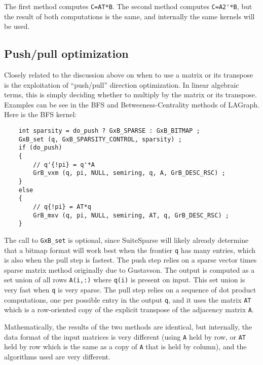 \documentclass[12pt]{article}
\begin{document}
The first method computes \verb'C=AT*B'.  The second method computes
\verb"C=A2'*B", but the result of both computations is the same, and internally
the same kernels will be used.

\subsection{Push/pull optimization}

Closely related to the discussion above on when to use a matrix or its
transpose is the exploitation of ``push/pull'' direction optimization.  In
linear algebraic terms, this is simply deciding whether to multiply by the
matrix or its transpose.  Examples can be see in the BFS and
Betweeness-Centrality methods of LAGraph.  Here is the BFS kernel:

    {\footnotesize
    \begin{verbatim}
    int sparsity = do_push ? GxB_SPARSE : GxB_BITMAP ;
    GxB_set (q, GxB_SPARSITY_CONTROL, sparsity) ;
    if (do_push)
    {
        // q'{!pi} = q'*A
        GrB_vxm (q, pi, NULL, semiring, q, A, GrB_DESC_RSC) ;
    }
    else
    {
        // q{!pi} = AT*q
        GrB_mxv (q, pi, NULL, semiring, AT, q, GrB_DESC_RSC) ;
    }\end{verbatim}}

The call to \verb'GxB_set' is optional, since SuiteSparse will likely already
determine that a bitmap format will work best when the frontier \verb'q' has
many entries, which is also when the pull step is fastest.  The push step
relies on a sparse vector times sparse matrix method originally due to
Gustavson.  The output is computed as a set union of all rows \verb'A(i,:)'
where \verb'q(i)' is present on input.  This set union is very fast when
\verb'q' is very sparse.  The pull step relies on a sequence of dot product
computations, one per possible entry in the output \verb'q', and it uses the
matrix \verb"AT" which is a row-oriented copy of the explicit transpose of the
adjacency matrix \verb'A'.

Mathematically, the results of the two methods are identical, but internally,
the data format of the input matrices is very different (using \verb'A' held
by row, or \verb'AT' held by row which is the same as a copy of \verb'A' that
is held by column), and the algorithms used are very different.
\end{document}
